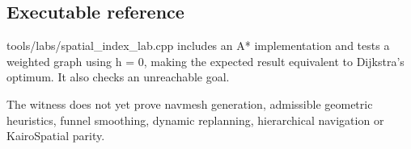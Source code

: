 \subsection{Executable reference}\label{appendix-5803241aa1a5-executable-reference}

tools/labs/spatial\_index\_lab.cpp includes an A* implementation and tests a weighted graph using h = 0, making the expected result equivalent to Dijkstra's optimum. It also checks an unreachable goal.

The witness does not yet prove navmesh generation, admissible geometric heuristics, funnel smoothing, dynamic replanning, hierarchical navigation or KairoSpatial parity.
